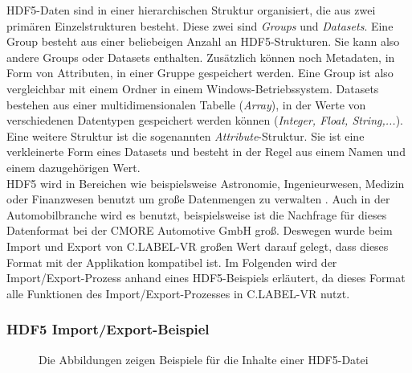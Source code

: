 HDF5-Daten sind in einer hierarchischen Struktur organisiert, die aus zwei primären Einzelstrukturen besteht. Diese zwei sind \textit{Groups} und \textit{Datasets}. Eine Group besteht aus einer beliebeigen Anzahl an HDF5-Strukturen. Sie kann also andere Groups oder Datasets enthalten. Zusätzlich können noch Metadaten, in Form von Attributen, in einer Gruppe gespeichert werden. Eine Group ist also vergleichbar mit einem Ordner in einem Windows-Betriebssystem. Datasets bestehen aus einer multidimensionalen Tabelle (\textit{Array}), in der Werte von verschiedenen Datentypen gespeichert werden können (\textit{Integer, Float, String,...}). Eine weitere Struktur ist die sogenannten \textit{Attribute}-Struktur. Sie ist eine verkleinerte Form eines Datasets und besteht in der Regel aus einem Namen und einem dazugehörigen Wert.\\

HDF5 wird in Bereichen wie beispielsweise Astronomie, Ingenieurwesen, Medizin oder Finanzwesen benutzt um große Datenmengen zu verwalten \cite{bib:WhoUsesHDF}. Auch in der Automobilbranche wird es benutzt, beispielsweise ist die Nachfrage für dieses Datenformat bei der CMORE Automotive GmbH groß. Deswegen wurde beim Import und Export von C.LABEL-VR großen Wert darauf gelegt, dass dieses Format mit der Applikation kompatibel ist. Im Folgenden wird der Import/Export-Prozess anhand eines HDF5-Beispiels erläutert, da dieses Format alle Funktionen des Import/Export-Prozesses in C.LABEL-VR nutzt.

\subsubsection{HDF5 Import/Export-Beispiel}
\label{sec:HDF5Example}

\begin{figure}%
    \centering
    \qquad
    \qquad
    \caption{Die Abbildungen zeigen Beispiele für die Inhalte einer HDF5-Datei}
\end{figure}

